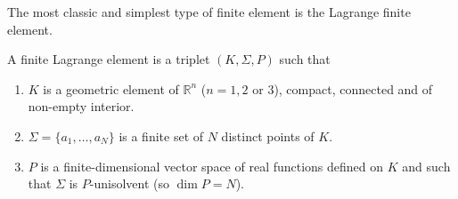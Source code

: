The most classic and simplest type of finite element is the Lagrange finite element.

\begin{Def}
	A finite Lagrange element is a triplet $(K,\Sigma,P)$ such that 
	\begin{enumerate}[label=\textbullet]
		\item $K$ is a geometric element of $\mathbb{R}^n$ ($n=1,2$ or $3$), compact, connected and of non-empty interior.
		\item $\Sigma=\{a_1,\dots,a_N\}$ is a finite set of $N$ distinct points of $K$.
		\item $P$ is a finite-dimensional vector space of real functions defined on $K$ and such that $\Sigma$ is $P$-unisolvent (so $\dim P=N$).
	\end{enumerate}
\end{Def}

